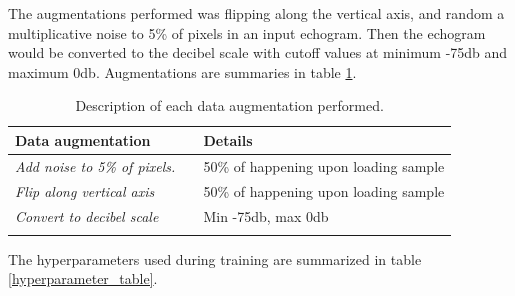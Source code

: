         The augmentations performed was flipping along the vertical axis, and random a multiplicative noise to 5\% of pixels in an input echogram. Then the echogram would be converted to the decibel scale with cutoff values at minimum -75db and maximum 0db. Augmentations are summaries in table \ref{data_augmentation_table}.
        
        \begin{longtable}{lll}

            \caption[Data augmentation summary]{Description of each data augmentation performed.}
            \\\hline
            \multicolumn{2}{|l|}{\textbf{Data augmentation}} & \multicolumn{1}{l|}{\textbf{Details}} \\ \hline
            \endfirsthead
            \endhead
            \textit{Add noise to 5\% of pixels.}      &       & 50\% of happening upon loading sample \\ \hline
            \textit{Flip along vertical axis}        &       & 50\% of happening upon loading sample \\ \hline
            \textit{Convert to decibel scale}        &       & Min -75db, max 0db                    \\ \hline
            \label{data_augmentation_table}
        \end{longtable}
        
        The hyperparameters used during training are summarized in table \ref{hyperparameter_table}.

